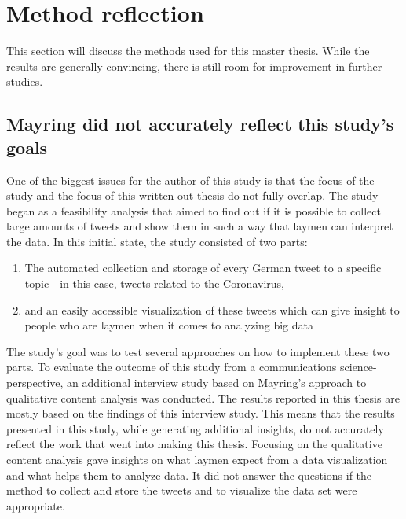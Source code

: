 \section{Method reflection}
This section will discuss the methods used for this master thesis. While the results are generally convincing, there is still room for improvement in further studies.

\subsection*{Mayring did not accurately reflect this study's goals}
One of the biggest issues for the author of this study is that the focus of the study and the focus of this written-out thesis do not fully overlap. The study began as a feasibility analysis that aimed to find out if it is possible to collect large amounts of tweets and show them in such a way that laymen can interpret the data. In this initial state, the study consisted of two parts:

\begin{enumerate}
    \item The automated collection and storage of every German tweet to a specific topic---in this case, tweets related to the Coronavirus,
    \item and an easily accessible visualization of these tweets which can give insight to people who are laymen when it comes to analyzing big data
\end{enumerate}

The study's goal was to test several approaches on how to implement these two parts. To evaluate the outcome of this study from a communications science-perspective, an additional interview study based on Mayring's approach to qualitative content analysis was conducted. The results reported in this thesis are mostly based on the findings of this interview study. This means that the results presented in this study, while generating additional insights, do not accurately reflect the work that went into making this thesis. Focusing on the qualitative content analysis gave insights on what laymen expect from a data visualization and what helps them to analyze data. It did not answer the questions if the method to collect and store the tweets and to visualize the data set were appropriate.

